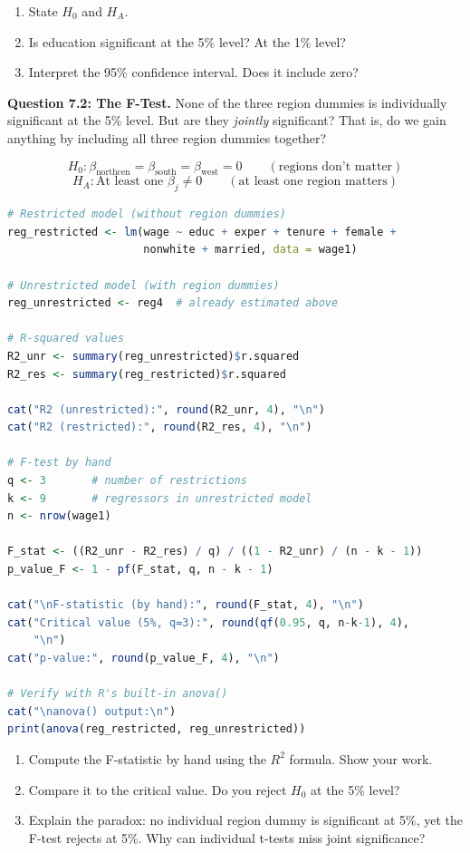 \documentclass[11pt,letterpaper]{article}
\begin{document}
\begin{enumerate}[label=(\alph*)]
\item State $H_0$ and $H_A$.
\item Is education significant at the 5\% level? At the 1\% level?
\item Interpret the 95\% confidence interval. Does it include zero?
\end{enumerate}

\vspace{3cm}

\textbf{Question 7.2: The F-Test.} None of the three region dummies is individually significant at the 5\% level. But are they \textit{jointly} significant? That is, do we gain anything by including all three region dummies together?

\[
H_0: \beta_{\text{northcen}} = \beta_{\text{south}} = \beta_{\text{west}} = 0 \qquad (\text{regions don't matter})
\]
\[
H_A: \text{At least one } \beta_j \neq 0 \qquad (\text{at least one region matters})
\]

\begin{lstlisting}[language=R]
# Restricted model (without region dummies)
reg_restricted <- lm(wage ~ educ + exper + tenure + female +
                     nonwhite + married, data = wage1)

# Unrestricted model (with region dummies)
reg_unrestricted <- reg4  # already estimated above

# R-squared values
R2_unr <- summary(reg_unrestricted)$r.squared
R2_res <- summary(reg_restricted)$r.squared

cat("R2 (unrestricted):", round(R2_unr, 4), "\n")
cat("R2 (restricted):", round(R2_res, 4), "\n")

# F-test by hand
q <- 3       # number of restrictions
k <- 9       # regressors in unrestricted model
n <- nrow(wage1)

F_stat <- ((R2_unr - R2_res) / q) / ((1 - R2_unr) / (n - k - 1))
p_value_F <- 1 - pf(F_stat, q, n - k - 1)

cat("\nF-statistic (by hand):", round(F_stat, 4), "\n")
cat("Critical value (5%, q=3):", round(qf(0.95, q, n-k-1), 4),
    "\n")
cat("p-value:", round(p_value_F, 4), "\n")

# Verify with R's built-in anova()
cat("\nanova() output:\n")
print(anova(reg_restricted, reg_unrestricted))
\end{lstlisting}

\begin{enumerate}[label=(\alph*)]
\item Compute the F-statistic by hand using the $R^2$ formula. Show your work.
\item Compare it to the critical value. Do you reject $H_0$ at the 5\% level?
\item Explain the paradox: no individual region dummy is significant at 5\%, yet the F-test rejects at 5\%. Why can individual t-tests miss joint significance?
\end{enumerate}
\end{document}
